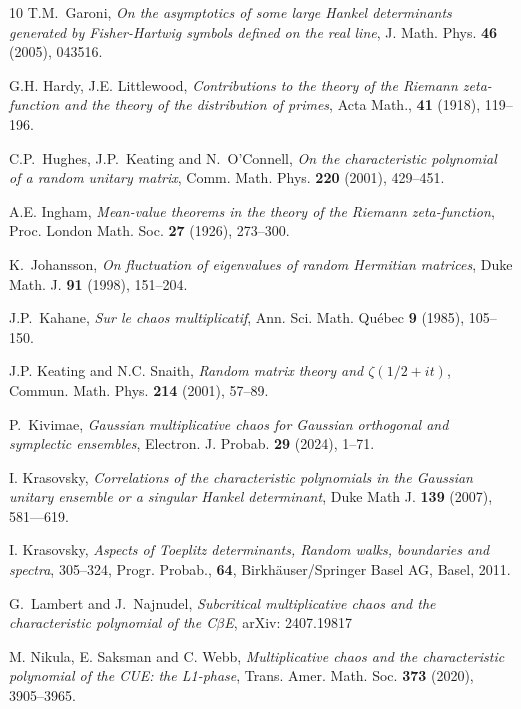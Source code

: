 \documentclass[11pt,a4paper]{article}
\numberwithin{equation}{section} %
\theoremstyle{plain}
\theoremstyle{definition}
\numberwithin{prop}{section}
\numberwithin{cor}{section}
\numberwithin{remark}{section}
\begin{document}
\begin{thebibliography}{10}
 T.M.~Garoni, \emph{On the asymptotics of some large Hankel determinants generated by Fisher-Hartwig symbols defined on the
real line}, J. Math. Phys. \textbf{46} (2005), 043516.



G.H. Hardy, J.E. Littlewood, \emph{Contributions to the theory of the Riemann zeta-function
and the theory of the distribution of primes}, Acta Math., \textbf{41} (1918), 119--196.

    C.P.~Hughes, J.P.~Keating  and N.~O'Connell, \emph{On the characteristic polynomial of a random
unitary matrix}, Comm. Math. Phys.  \textbf{220} (2001), 429--451.

A.E. Ingham, \emph{Mean-value theorems in the theory of the Riemann zeta-function}, Proc.
London Math. Soc. \textbf{27} (1926), 273--300.


 K.~Johansson, \emph{On fluctuation of eigenvalues of random {Hermitian} matrices},
  Duke Math. J. \textbf{91} (1998), 151--204.

J.P.~Kahane, \emph{Sur le chaos multiplicatif}, Ann. Sci. Math. Qu\'ebec \textbf{9} (1985), 105--150.


J.P. Keating and N.C. Snaith, \emph{Random matrix theory and $\zeta(1/2 +
  it)$}, Commun. Math. Phys. \textbf{214} (2001), 57--89.
  
  P.~Kivimae, \emph{Gaussian multiplicative chaos for Gaussian orthogonal and symplectic ensembles}, 
  Electron. J. Probab. \textbf{29} (2024), 1--71.
  
  I. Krasovsky, \emph{Correlations of the characteristic polynomials in the Gaussian unitary ensemble or a singular Hankel determinant}, Duke Math J. \textbf{139} (2007), 581---619.
  
  I. Krasovsky, \emph{Aspects of Toeplitz determinants, Random walks, boundaries and spectra},
305--324, Progr. Probab., \textbf{64}, Birkh\"auser/Springer Basel AG, Basel, 2011.


G.~Lambert and J.~Najnudel, \emph{Subcritical multiplicative chaos and the characteristic
polynomial of the C$\beta$E}, arXiv: 2407.19817


M. Nikula, E. Saksman and C. Webb,  \emph{Multiplicative chaos and the characteristic polynomial of the CUE: the L1-phase},
Trans. Amer. Math. Soc. \textbf{373} (2020), 3905--3965.



\end{thebibliography}
\end{document}
